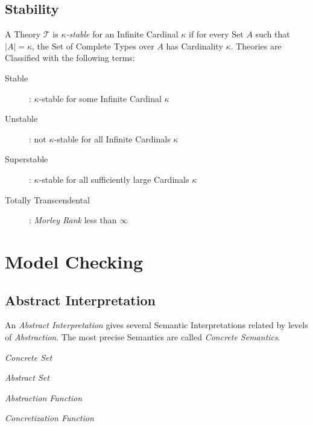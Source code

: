\subsection{Stability}\label{sec:model_stability}

A Theory $\mathcal{T}$ is \emph{$\kappa$-stable} for an Infinite
Cardinal $\kappa$ if for every Set $A$ such that $|A| = \kappa$, the
Set of Complete Types over $A$ has Cardinality $\kappa$. Theories are
Classified with the following terms:
\begin{description}
\item [Stable]: $\kappa$-stable for some Infinite Cardinal $\kappa$
\item [Unstable]: not $\kappa$-stable for all Infinite Cardinals
  $\kappa$
\item [Superstable]: $\kappa$-stable for all sufficiently large
  Cardinals $\kappa$
\item [Totally Transcendental]: \emph{Morley Rank}\cite{morley65} less
  than $\infty$
\end{description}



\section{Model Checking}\label{sec:model_checking}

\subsection{Abstract Interpretation}\label{sec:abstract_interpretation}

An \emph{Abstract Interpretation} gives several Semantic
Interpretations related by levels of \emph{Abstraction}. The most
precise Semantics are called \emph{Concrete Semantics}.

\emph{Concrete Set}

\emph{Abstract Set}

\emph{Abstraction Function}

\emph{Concretization Function}

